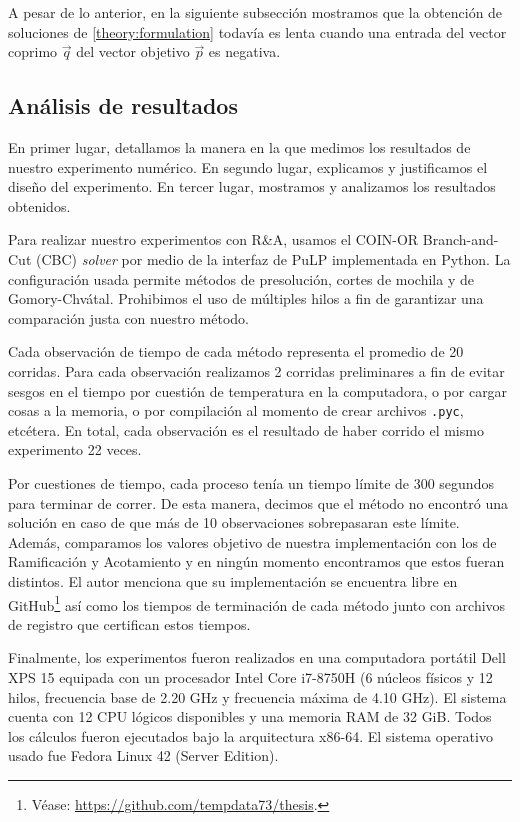 A pesar de lo anterior, en la siguiente subsección mostramos que la obtención de soluciones de
\eqref{theory:formulation} todavía es lenta cuando una entrada del vector coprimo $\vec{q}$ del
vector objetivo $\vec{p}$ es negativa.

\subsection{Análisis de resultados}
\label{subsec:inf:res}
\noindent
En primer lugar, detallamos la manera en la que medimos los resultados de nuestro experimento
numérico. En segundo lugar, explicamos y justificamos el diseño del experimento. En tercer lugar,
mostramos y analizamos los resultados obtenidos.

Para realizar nuestro experimentos con R\&A, usamos el COIN-OR Branch-and-Cut (CBC) \textit{solver}
por medio de la interfaz de PuLP implementada en Python. La configuración usada permite métodos de
presolución, cortes de mochila y de Gomory-Chvátal. Prohibimos el uso de múltiples hilos a fin de
garantizar una comparación justa con nuestro método.

Cada observación de tiempo de cada método representa el promedio de 20 corridas. Para cada
observación realizamos 2 corridas preliminares a fin de evitar sesgos en el tiempo por cuestión de
temperatura en la computadora, o por cargar cosas a la memoria, o por compilación al momento de
crear archivos \texttt{.pyc}, etcétera. En total, cada observación es el resultado de haber corrido
el mismo experimento 22 veces.

Por cuestiones de tiempo, cada proceso tenía un tiempo límite de 300 segundos para terminar de
correr. De esta manera, decimos que el método no encontró una solución en caso de que más de 10
observaciones sobrepasaran este límite. Además, comparamos los valores objetivo de nuestra
implementación con los de Ramificación y Acotamiento y en ningún momento encontramos que estos
fueran distintos. El autor menciona que su implementación se encuentra libre en
GitHub\footnote{Véase: \url{https://github.com/tempdata73/thesis}.} así como
los tiempos de terminación de cada método junto con archivos de registro que
certifican estos tiempos.

Finalmente, los experimentos fueron realizados en una computadora portátil Dell XPS 15 equipada con
un procesador Intel Core i7-8750H (6 núcleos físicos y 12 hilos, frecuencia base de 2.20 GHz y
frecuencia máxima de 4.10 GHz). El sistema cuenta con 12 CPU lógicos disponibles y una memoria RAM
de 32 GiB. Todos los cálculos fueron ejecutados bajo la arquitectura x86-64. El sistema operativo
usado fue Fedora Linux 42 (Server Edition).

